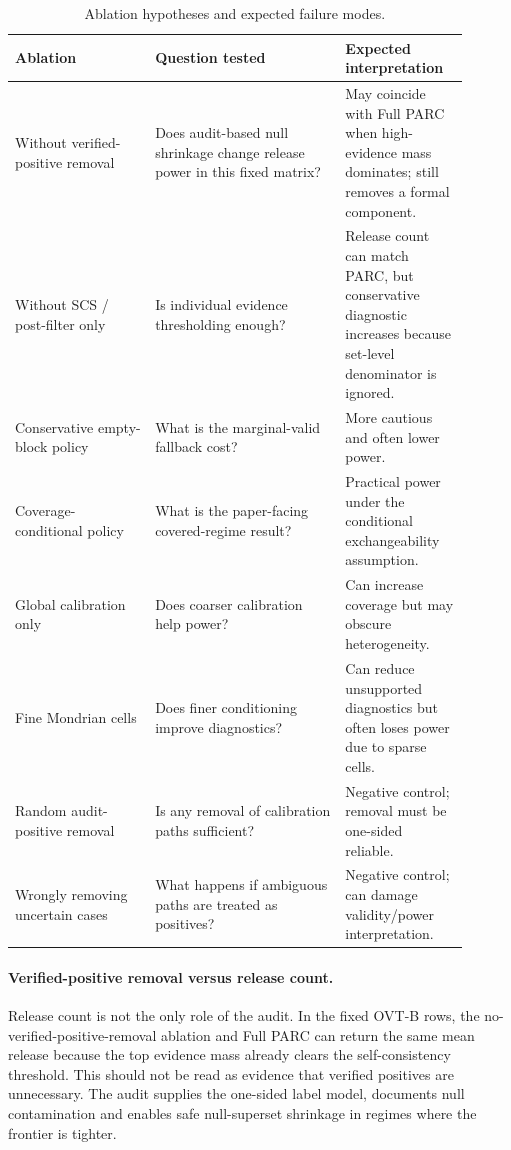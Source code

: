 \documentclass[11pt]{article}
\begin{document}
\begin{table}[h]
\centering
\caption{Ablation hypotheses and expected failure modes.}
\small
\begin{tabular}{p{0.28\linewidth}p{0.38\linewidth}p{0.24\linewidth}}
\toprule
Ablation & Question tested & Expected interpretation \\
\midrule
Without verified-positive removal & Does audit-based null shrinkage change release power in this fixed matrix? & May coincide with Full PARC when high-evidence mass dominates; still removes a formal component. \\
Without SCS / post-filter only & Is individual evidence thresholding enough? & Release count can match PARC, but conservative diagnostic increases because set-level denominator is ignored. \\
Conservative empty-block policy & What is the marginal-valid fallback cost? & More cautious and often lower power. \\
Coverage-conditional policy & What is the paper-facing covered-regime result? & Practical power under the conditional exchangeability assumption. \\
Global calibration only & Does coarser calibration help power? & Can increase coverage but may obscure heterogeneity. \\
Fine Mondrian cells & Does finer conditioning improve diagnostics? & Can reduce unsupported diagnostics but often loses power due to sparse cells. \\
Random audit-positive removal & Is any removal of calibration paths sufficient? & Negative control; removal must be one-sided reliable. \\
Wrongly removing uncertain cases & What happens if ambiguous paths are treated as positives? & Negative control; can damage validity/power interpretation. \\
\bottomrule
\end{tabular}
\end{table}

\paragraph{Verified-positive removal versus release count.}
Release count is not the only role of the audit.
In the fixed OVT-B rows, the no-verified-positive-removal ablation and Full PARC can return the same mean release because the top evidence mass already clears the self-consistency threshold.
This should not be read as evidence that verified positives are unnecessary.
The audit supplies the one-sided label model, documents null contamination and enables safe null-superset shrinkage in regimes where the frontier is tighter.
\end{document}
